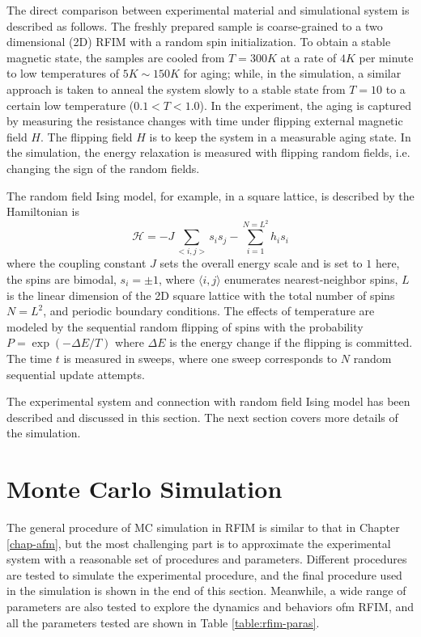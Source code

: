 The direct comparison between experimental material and simulational system is described as follows. The freshly prepared sample is coarse-grained to a two dimensional (2D) RFIM with a random spin initialization.  To obtain a stable magnetic state, the samples are cooled from $T=300K$ at a rate of $4K$ per minute to  low temperatures of $5K \sim 150K$ for aging; while, in the simulation, a similar approach is taken to anneal the system slowly to a stable state from $T=10$ to a certain low temperature ($0.1<T<1.0$). In the experiment, the aging is captured by measuring the resistance changes with time under flipping external magnetic field $H$. The flipping field $H$ is to keep the system in a measurable aging state. In the simulation, the energy relaxation is measured with flipping random fields, i.e. changing the sign of the random fields.

The random field Ising model, for example, in a square lattice, is described by the Hamiltonian is
\begin{equation}\label{energy}
\mathcal{H}=-J\sum_{<i,j>}s_{i}s_{j}-\sum_{i=1}^{N=L^{2}}h_{i}s_{i}
\end{equation}
where the coupling constant $J$ sets the overall energy scale and
is set to $1$ here, the spins are bimodal, $s_{i}=\pm1$, where $
\langle i,j \rangle$
enumerates nearest-neighbor spins,  $L$ is the linear dimension of the 2D square lattice with the total number of spins $N=L^{2}$, and periodic boundary conditions. The effects of temperature are modeled by the sequential random flipping of spins with the probability $P=\exp(-\Delta E/T)$ where $\Delta E$ is the energy change if the flipping is committed. The time $t$ is measured in sweeps, where one sweep corresponds to $N$ random sequential update attempts.  

The experimental system and connection with random field Ising model has been described and discussed in this section. The next section covers more details of the simulation.


\section{Monte Carlo Simulation}
The general procedure of MC simulation in RFIM is similar to that in Chapter \ref{chap-afm}, but the most challenging part is to approximate the experimental system with a reasonable set of procedures and parameters. Different procedures are tested to simulate the experimental procedure, and the final procedure used in the simulation is shown in the end of this section. Meanwhile, a wide range of parameters are also tested to explore the dynamics and behaviors ofm RFIM, and all the parameters tested are shown in Table \ref{table:rfim-paras}. 

